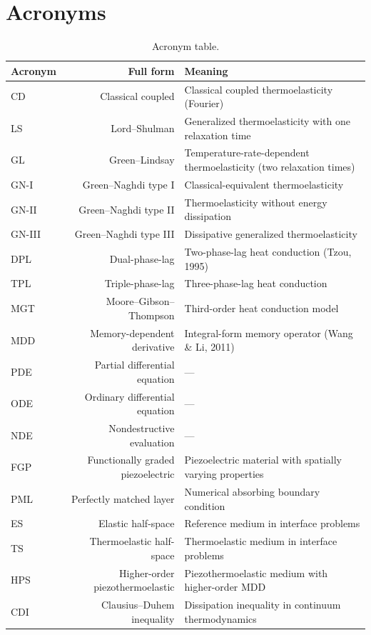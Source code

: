 \section*{Acronyms}

\begin{table}[htbp]
\centering
\small
\caption{Acronym table.}
\label{tab:acronyms}
\begin{tabularx}{\textwidth}{@{}lrX@{}}
\toprule
\textbf{Acronym} & \textbf{Full form} & \textbf{Meaning} \\
\midrule
CD & Classical coupled & Classical coupled thermoelasticity (Fourier) \\
LS & Lord--Shulman & Generalized thermoelasticity with one relaxation time \\
GL & Green--Lindsay & Temperature-rate-dependent thermoelasticity (two relaxation times) \\
GN-I & Green--Naghdi type I & Classical-equivalent thermoelasticity \\
GN-II & Green--Naghdi type II & Thermoelasticity without energy dissipation \\
GN-III & Green--Naghdi type III & Dissipative generalized thermoelasticity \\
DPL & Dual-phase-lag & Two-phase-lag heat conduction (Tzou, 1995) \\
TPL & Triple-phase-lag & Three-phase-lag heat conduction \\
MGT & Moore--Gibson--Thompson & Third-order heat conduction model \\
MDD & Memory-dependent derivative & Integral-form memory operator (Wang \& Li, 2011) \\
PDE & Partial differential equation & --- \\
ODE & Ordinary differential equation & --- \\
NDE & Nondestructive evaluation & --- \\
FGP & Functionally graded piezoelectric & Piezoelectric material with spatially varying properties \\
PML & Perfectly matched layer & Numerical absorbing boundary condition \\
ES & Elastic half-space & Reference medium in interface problems \\
TS & Thermoelastic half-space & Thermoelastic medium in interface problems \\
HPS & Higher-order piezothermoelastic & Piezothermoelastic medium with higher-order MDD \\
CDI & Clausius--Duhem inequality & Dissipation inequality in continuum thermodynamics \\
\bottomrule
\end{tabularx}
\end{table}
